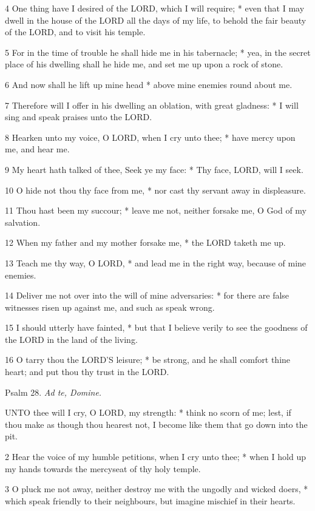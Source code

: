 4 One thing have I desired of the LORD,
which I will require; * even that I may dwell in the house of the LORD
all the days of my life, to behold the fair beauty of the LORD,
and to visit his temple.

5 For in the time of trouble he shall hide me in his
tabernacle; * yea, in the secret place of his dwelling shall he hide me,
and set me up upon a rock of stone.

6 And now shall he lift up mine head * above mine enemies
round about me.

7 Therefore will I offer in his dwelling an oblation,
with great gladness: * I will sing and speak praises unto the LORD.

8 Hearken unto my voice, O LORD,
when I cry unto thee; * have mercy upon me, and hear me.

9 My heart hath talked of thee, Seek ye my face: *
Thy face, LORD, will I seek.

10 O hide not thou thy face from me, * nor cast thy
servant away in displeasure.

11 Thou hast been my succour; * leave me not, neither
forsake me, O God of my salvation.

12 When my father and my mother forsake me, * the LORD
taketh me up.

13 Teach me thy way, O LORD,
* and lead me in the right way, because of mine enemies.

14 Deliver me not over into the will of mine adversaries:
* for there are false witnesses risen up against me, and such as speak
wrong.

15 I should utterly have fainted, * but that I believe
verily to see the goodness of the LORD in the land
of the living.

16 O tarry thou the LORD’S
leisure; * be strong, and he shall comfort thine heart; and put thou thy
trust in the LORD.

Psalm
28. \emph{Ad te, Domine.}

UNTO
thee will I cry, O LORD, my strength: * think no
scorn of me; lest, if thou make as though thou hearest not, I become like
them that go down into the pit.

2 Hear the voice of my humble petitions, when I cry
unto thee; * when I hold up my hands towards the mercyseat of thy holy
temple.

3 O pluck me not away, neither destroy me with the
ungodly and wicked doers, * which speak friendly to their neighbours,
but imagine mischief in their hearts.

